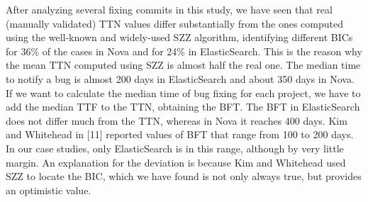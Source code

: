 \documentclass[a4paper, 12pt]{book}
\begin{document}
After analyzing several fixing commits in this study, we have seen that real (manually validated) TTN values differ substantially from the ones computed using the well-known and widely-used SZZ algorithm, identifying different BICs for 36\% of the cases in Nova and for 24\% in ElasticSearch. This is the reason why the mean TTN computed using SZZ is almost half the real one.
The median time to notify a bug is almost 200 days in ElasticSearch and about 350 days in Nova. If we want to calculate the median time of bug fixing for each project, we have to add the median TTF to the TTN, obtaining the BFT. The BFT in ElasticSearch does not differ much from the TTN, whereas in Nova it reaches 400 days. Kim and Whitehead in [11] reported values of BFT that range from 100 to 200 days. In our case studies, only ElasticSearch is in this range, although by very little margin. An explanation for the deviation is because Kim and Whitehead used SZZ to locate the BIC, which we have found is not only always true, but provides an optimistic value.
\end{document}
